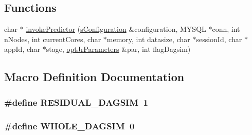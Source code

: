 \subsection*{Functions}
\begin{DoxyCompactItemize}
\item 
char $\ast$ \hyperlink{invokePredictor_8hh_a342ccdfe7923368e52a4894d69c7455a}{invoke\-Predictor} (\hyperlink{readConfigurationFile_8hh_ab8f35b1da3261263c5e9c0e7c8921f5c}{s\-Configuration} \&configuration, M\-Y\-S\-Q\-L $\ast$conn, int n\-Nodes, int current\-Cores, char $\ast$memory, int datasize, char $\ast$session\-Id, char $\ast$app\-Id, char $\ast$stage, \hyperlink{classoptJrParameters}{opt\-Jr\-Parameters} \&par, int flag\-Dagsim)
\end{DoxyCompactItemize}


\subsection{Macro Definition Documentation}
\hypertarget{invokePredictor_8hh_a016c9fba38e790ceafd4d9843f2dc564}{
\subsubsection[{R\-E\-S\-I\-D\-U\-A\-L\-\_\-\-D\-A\-G\-S\-I\-M}]{\setlength{\rightskip}{0pt plus 5cm}\#define R\-E\-S\-I\-D\-U\-A\-L\-\_\-\-D\-A\-G\-S\-I\-M~1}}\label{invokePredictor_8hh_a016c9fba38e790ceafd4d9843f2dc564}
\hypertarget{invokePredictor_8hh_a3806de5f70b6971cfe8be82520f4bf2a}{
\subsubsection[{W\-H\-O\-L\-E\-\_\-\-D\-A\-G\-S\-I\-M}]{\setlength{\rightskip}{0pt plus 5cm}\#define W\-H\-O\-L\-E\-\_\-\-D\-A\-G\-S\-I\-M~0}}\label{invokePredictor_8hh_a3806de5f70b6971cfe8be82520f4bf2a}



